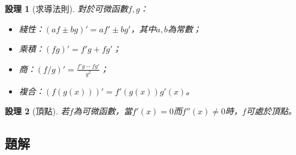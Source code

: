 \documentclass[12pt]{article}
\newtheorem*{proposition}{設理}
\begin{document}
    \begin{proposition}[求導法則]
        對於可微函數$f,g$：\begin{itemize}
            \item 綫性：$(af\pm bg)'=af'\pm bg'$，其中$a,b$為常數；
            \item 乘積：$(fg)'=f'g+fg'$；
            \item 商：$(f/g)'=\frac{f'g-fg'}{g^2}$；
            \item 複合：$(f(g(x)))'=f'(g(x))g'(x)$。
        \end{itemize}
    \end{proposition}

    \begin{proposition}[頂點]
        若$f$為可微函數，當$f'(x)=0$而$f''(x)\neq 0$時，$f$可處於頂點。
    \end{proposition}

    \subsection*{題解}
\end{document}
